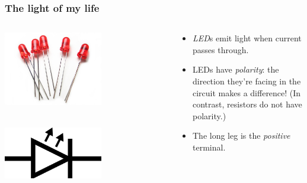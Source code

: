 \documentclass{beamer}
\begin{document}
\begin{frame}
  \frametitle{The light of my life}

  \begin{columns}
    \begin{column}{0.5\textwidth}
      \centering
      
      \includegraphics[width=0.6\textwidth]{res/led.jpg}

      ~ \\

      \includegraphics[width=0.6\textwidth]{res/led-symbol.png}
    \end{column}
    \begin{column}{0.5\textwidth}
      \begin{itemize}
        \item
          \emph{LED}s emit light when current passes through.
        \item
          LEDs have \emph{polarity}: the direction they're facing in the circuit
          makes a difference!
          (In contrast, resistors do not have polarity.)

        \item
          The long leg is the \emph{positive} terminal.
      \end{itemize}
    \end{column}
  \end{columns}
\end{frame}
\end{document}
